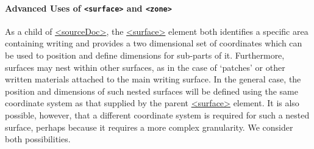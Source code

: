 \paragraph[{Advanced Uses of surface and zone}]{Advanced Uses of \texttt{<surface>} and \texttt{<zone>}}\label{PH-surfzone}\par
As a child of \hyperref[TEI.sourceDoc]{<sourceDoc>}, the \hyperref[TEI.surface]{<surface>} element both identifies a specific area containing writing and provides a two dimensional set of coordinates which can be used to position and define dimensions for sub-parts of it. Furthermore, surfaces may nest within other surfaces, as in the case of ‘patches’ or other written materials attached to the main writing surface. In the general case, the position and dimensions of such nested surfaces will be defined using the same coordinate system as that supplied by the parent \hyperref[TEI.surface]{<surface>} element. It is also possible, however, that a different coordinate system is required for such a nested surface, perhaps because it requires a more complex granularity. We consider both possibilities.\par
